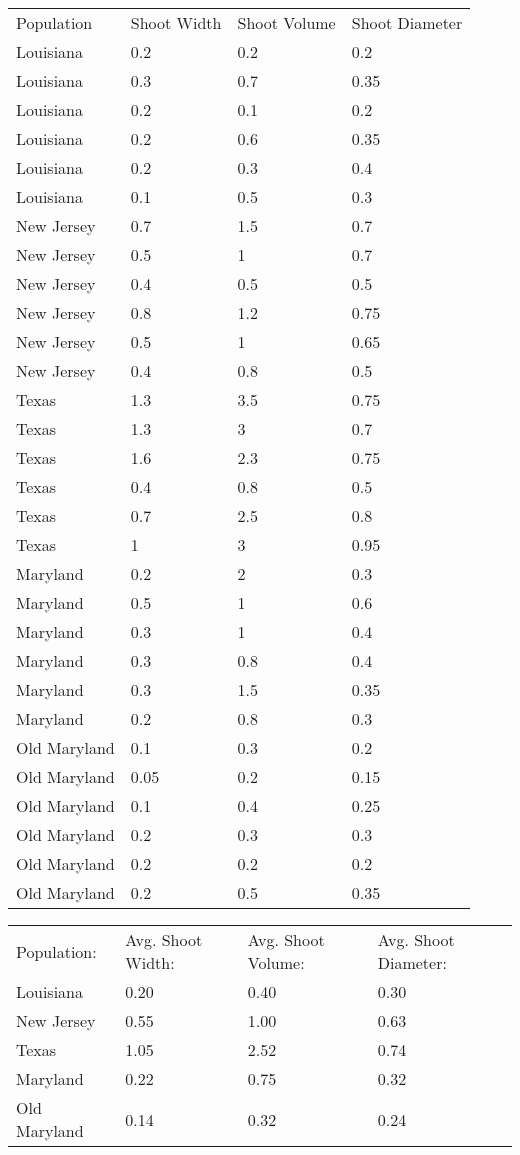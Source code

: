 
\begin{tabular}{| l | l | l | l |}
Population & Shoot Width & Shoot Volume & Shoot Diameter \\
Louisiana & 0.2 & 0.2 & 0.2 \\
Louisiana & 0.3 & 0.7 & 0.35 \\
Louisiana & 0.2 & 0.1 & 0.2 \\
Louisiana & 0.2 & 0.6 & 0.35 \\
Louisiana & 0.2 & 0.3 & 0.4 \\
Louisiana & 0.1 & 0.5 & 0.3 \\
New Jersey & 0.7 & 1.5 & 0.7 \\
New Jersey & 0.5 & 1 & 0.7 \\
New Jersey & 0.4 & 0.5 & 0.5 \\
New Jersey & 0.8 & 1.2 & 0.75 \\
New Jersey & 0.5 & 1 & 0.65 \\
New Jersey & 0.4 & 0.8 & 0.5 \\
Texas & 1.3 & 3.5 & 0.75 \\
Texas & 1.3 & 3 & 0.7 \\
Texas & 1.6 & 2.3 & 0.75 \\
Texas & 0.4 & 0.8 & 0.5 \\
Texas & 0.7 & 2.5 & 0.8 \\
Texas & 1 & 3 & 0.95 \\
Maryland & 0.2 & 2 & 0.3 \\
Maryland & 0.5 & 1 & 0.6 \\
Maryland & 0.3 & 1 & 0.4 \\
Maryland & 0.3 & 0.8 & 0.4 \\
Maryland & 0.3 & 1.5 & 0.35 \\
Maryland & 0.2 & 0.8 & 0.3 \\
Old Maryland & 0.1 & 0.3 & 0.2 \\
Old Maryland & 0.05 & 0.2 & 0.15 \\
Old Maryland & 0.1 & 0.4 & 0.25 \\
Old Maryland & 0.2 & 0.3 & 0.3 \\
Old Maryland & 0.2 & 0.2 & 0.2 \\
Old Maryland & 0.2 & 0.5 & 0.35 \\
\end{tabular}
   
\vspace{10 mm}
\begin{tabular}{| l | l | l | l |}
Population: & Avg. Shoot Width: & Avg. Shoot Volume: & Avg. Shoot Diameter: \\
Louisiana & 0.20 & 0.40 & 0.30 \\New Jersey & 0.55 & 1.00 & 0.63 \\Texas & 1.05 & 2.52 & 0.74 \\Maryland & 0.22 & 0.75 & 0.32 \\Old Maryland & 0.14 & 0.32 & 0.24 \\\end{tabular}

